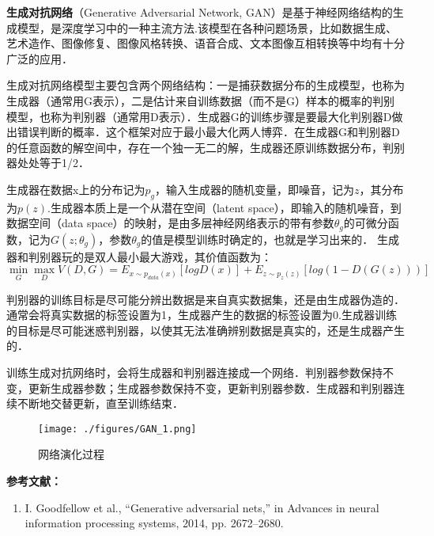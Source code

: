 
\textbf{生成对抗网络}（Generative Adversarial Network, GAN）是基于神经网络结构的生成模型，是深度学习中的一种主流方法.该模型在各种问题场景，比如数据生成、艺术造作、图像修复、图像风格转换、语音合成、文本图像互相转换等中均有十分广泛的应用．

生成对抗网络模型主要包含两个网络结构：一是捕获数据分布的生成模型，也称为生成器（通常用G表示），二是估计来自训练数据（而不是G）样本的概率的判别模型，也称为判别器（通常用D表示）．生成器G的训练步骤是要最大化判别器D做出错误判断的概率．这个框架对应于最小最大化两人博弈．在生成器G和判别器D的任意函数的解空间中，存在一个独一无二的解，生成器还原训练数据分布，判别器处处等于1/2．

生成器在数据x上的分布记为$p_g$，输入生成器的随机变量，即噪音，记为$z$，其分布为$p(z)$.生成器本质上是一个从潜在空间（latent space），即输入的随机噪音，到数据空间（data space）的映射，是由多层神经网络表示的带有参数$\theta_g$的可微分函数，记为$G(z;\theta_g)$，参数$\theta_g$的值是模型训练时确定的，也就是学习出来的．
生成器和判别器玩的是双人最小最大游戏，其价值函数为：
\begin{equation}
\mathop{\min}\limits_G \mathop {\max }\limits_D V(D,G)=E_{x\sim p_{data}(x)}[logD(x)]+E_{z\sim p_z(z)}[log(1-D(G(z)))]
\end{equation}


判别器的训练目标是尽可能分辨出数据是来自真实数据集，还是由生成器伪造的．通常会将真实数据的标签设置为1，生成器产生的数据的标签设置为0.生成器训练的目标是尽可能迷惑判别器，以使其无法准确辨别数据是真实的，还是生成器产生的．

训练生成对抗网络时，会将生成器和判别器连接成一个网络．判别器参数保持不变，更新生成器参数；生成器参数保持不变，更新判别器参数．生成器和判别器连续不断地交替更新，直至训练结束．
\begin{figure}[ht]
\centering
\texttt{[image: ./figures/GAN\_1.png]}
\caption{网络演化过程} \label{GAN_fig1}
\end{figure}





\textbf{参考文献：}
\begin{enumerate}
\item I. Goodfellow et al., “Generative adversarial nets,” in Advances in neural information processing systems, 2014, pp. 2672–2680.
\end{enumerate}